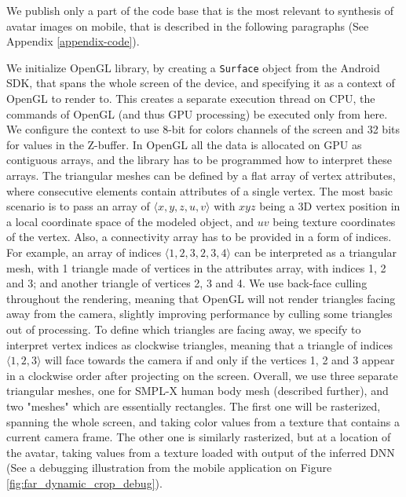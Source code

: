 We publish only a part of the code base that is the most relevant to synthesis of avatar images on mobile, that is described in the following paragraphs (See Appendix \ref{appendix-code}).

We initialize OpenGL library, by creating a \verb|Surface| object from the Android SDK, that spans the whole screen of the device, and specifying it as a context of OpenGL to render to. This creates a separate execution thread on CPU, the commands of OpenGL (and thus GPU processing) be executed only from here. We configure the context to use 8-bit for colors channels of the screen and 32 bits for values in the Z-buffer. In OpenGL all the data is allocated on GPU as contiguous arrays, and the library has to be programmed how to interpret these arrays. The triangular meshes can be defined by a flat array of vertex attributes, where consecutive elements contain attributes of a single vertex. The most basic scenario is to pass an array of $\langle x, y, z, u, v\rangle$ with $xyz$ being a 3D vertex position in a local coordinate space of the modeled object, and $uv$ being texture coordinates of the vertex. Also, a connectivity array has to be provided in a form of indices. For example, an array of indices $\langle1, 2, 3, 2, 3, 4\rangle$ can be interpreted as a triangular mesh, with 1 triangle made of vertices in the attributes array, with indices 1, 2 and 3; and another triangle of vertices 2, 3 and 4. We use back-face culling throughout the rendering, meaning that OpenGL will not render triangles facing away from the camera, slightly improving performance by culling some triangles out of processing. To define which triangles are facing away, we specify to interpret vertex indices as clockwise triangles, meaning that a triangle of indices $\langle1, 2, 3\rangle$ will face towards the camera if and only if the vertices 1, 2 and 3 appear in a clockwise order after projecting on the screen. Overall, we use three separate triangular meshes, one for SMPL-X human body mesh (described further), and two "meshes" which are essentially rectangles. The first one will be rasterized, spanning the whole screen, and taking color values from a texture that contains a current camera frame. The other one is similarly rasterized, but at a location of the avatar, taking values from a texture loaded with output of the inferred DNN (See a debugging illustration from the mobile application on Figure \ref{fig:far_dynamic_crop_debug}).

